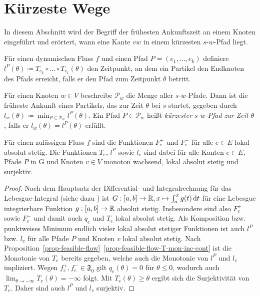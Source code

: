 \section{Kürzeste Wege}\label{sec-travel-times}

In diesem Abschnitt wird der Begriff der frühesten Ankunftszeit an einem Knoten eingeführt und erörtert, wann eine Kante $vw$ in einem kürzesten $s$-$w$-Pfad liegt.

\begin{definition}
	Für einen dynamischen Fluss $f$ und einen Pfad $P=(e_1,\dots,e_k)$ definiere $l^P(\theta)\coloneq T_{e_k}\circ\dots\circ T_{e_1}(\theta)$ den Zeitpunkt, an dem ein Partikel den Endknoten des Pfads erreicht, falls er den Pfad zum Zeitpunkt $\theta$ betritt.
	
	Für einen Knoten $w\in V$ beschreibe $\mathcal{P}_w$ die Menge aller $s$-$w$-Pfade.
	Dann ist die früheste Ankunft eines Partikels, das zur Zeit $\theta$ bei $s$ startet, gegeben durch $l_w(\theta)\coloneq \min_{P\in\mathcal{P}_w}l^P(\theta)$.
	Ein Pfad $P\in \mathcal{P}_w$ heißt \emph{kürzester $s$-$w$-Pfad zur Zeit $\theta$}, falls er $l_w(\theta)=l^P(\theta)$ erfüllt.
\end{definition}

\begin{proposition}\label{prop-abs-cont-sur}
	Für einen zulässigen Fluss $f$ sind die Funktionen $F_e^+$ und $F_e^-$ für alle $e\in E$ lokal absolut stetig.
	Die Funktionen $T_e$, $l^P$ sowie $l_v$ sind dabei für alle Kanten $e\in E$, Pfade $P$ in G und Knoten $v\in V$ monoton wachsend, lokal absolut stetig und surjektiv.
\end{proposition}
\begin{proof}
	Nach dem Hauptsatz der Differential- und Integralrechnung für das Lebesgue-Inte\-gral (siehe dazu \cite[Satz 4.14]{Elstrodt2011Abs}) ist $G: [a,b] \to \mathbb{R}, x\mapsto \int_a^x g(t) \mathop{}\!\mathrm{d} t$ für eine Lebesgue integrierbare Funktion $g: [a,b] \to \mathbb{R}$ absolut stetig.
	Insbesondere sind also $F_e^+$ sowie $F_e^-$ und damit auch $q_e$ und $T_e$ lokal absolut stetig.
	Als Komposition bzw. punktweises Minimum endlich vieler lokal absolut stetiger Funktionen ist auch $l^P$ bzw. $l_v$ für alle Pfade $P$ und Knoten $v$ lokal absolut stetig.
	Nach Proposition~\ref{prop-feasible-flow}~\ref{prop-feasible-flow-T-mon-inc-cont} ist die Monotonie von $T_e$ bereits gegeben, welche auch die Monotonie von $l^P$ und $l_v$ impliziert.
	Wegen $f_e^+, f_e^-\in\mathfrak{F_0}$ gilt $q_e(\theta)=0$ für $\theta\leq 0$, wodurch auch $\lim_{\theta\to-\infty} T_e(\theta) = - \infty$ folgt.
	Mit $T_e(\theta)\geq \theta$ ergibt sich die Surjektivität von $T_e$.
	Daher sind auch $l^P$ und $l_v$ surjektiv.
\end{proof}

